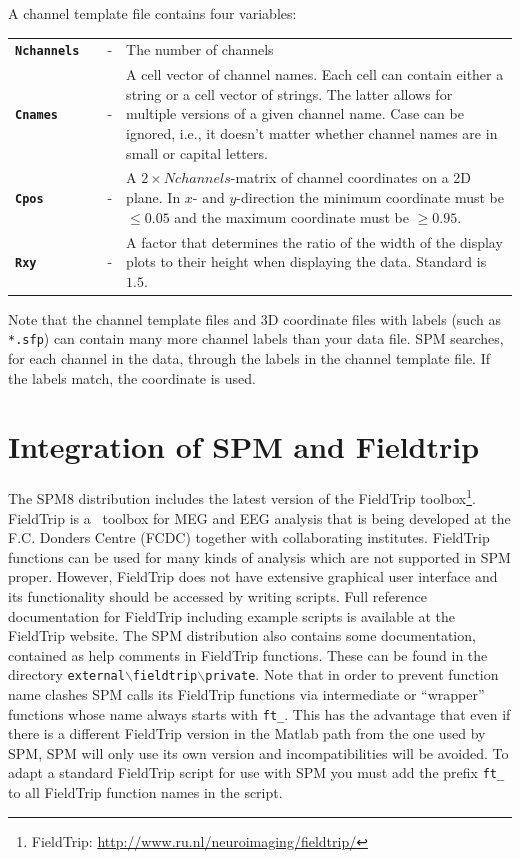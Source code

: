 A channel template file contains four variables:\\

\begin{tabular}{llcp{9cm}}

{\bf \texttt{Nchannels}} & &  - & The number of channels\\

{\bf \texttt{Cnames}}&  & - & A cell vector of channel names. Each cell can contain either a string or a cell vector of strings. The latter allows
for multiple versions of a given channel name. Case can be ignored, i.e., it doesn't matter whether channel names are in small or capital letters.\\

{\bf \texttt{Cpos}} & & - & A $2 \times Nchannels$-matrix of channel coordinates on a 2D plane. In $x$- and $y$-direction the minimum coordinate must be $\leq 0.05$ and the maximum coordinate must be $\geq 0.95$. \\

{\bf \texttt{Rxy}} & & - & A factor that determines the ratio of the width of the display plots to their height when displaying the data. Standard is $1.5$. \\

\end{tabular}

Note that the channel template files and 3D coordinate files with labels (such as \texttt{*.sfp}) can contain many more channel labels than your data file. SPM searches, for each channel in the data, through the labels in the channel template file. If the labels match, the coordinate is used.

\section{Integration of SPM and Fieldtrip}
The SPM8 distribution includes the latest version of the FieldTrip toolbox\footnote{FieldTrip: \url{http://www.ru.nl/neuroimaging/fieldtrip/}}. FieldTrip is a \matlab\ toolbox for MEG and EEG analysis that is being developed at the F.C. Donders Centre (FCDC) together with collaborating institutes. FieldTrip functions can be used for many kinds of analysis which are not supported in SPM proper. However, FieldTrip does not have extensive graphical user interface and its functionality should be accessed by writing scripts. Full reference documentation for FieldTrip including example scripts is available at the FieldTrip website. The SPM distribution also contains some documentation, contained as help comments in FieldTrip functions. These can be found in the directory \texttt{external$\backslash$fieldtrip$\backslash$private}. Note that in order to prevent function name clashes SPM calls its FieldTrip functions via intermediate or ``wrapper'' functions whose name always starts with \texttt{ft\_}. This has the advantage that even if there is a different FieldTrip version in the Matlab path from the one used by SPM, SPM will only use its own version and incompatibilities will be avoided. To adapt a standard FieldTrip script for use with SPM you must add the prefix \texttt{ft\_} to all FieldTrip function names in the script.

